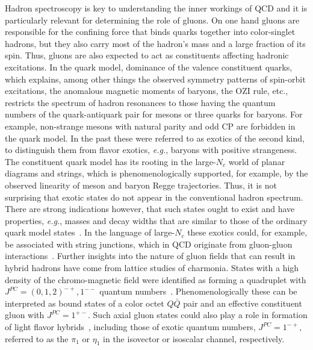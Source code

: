 Hadron spectroscopy is key to understanding the inner workings of QCD and it is particularly relevant for determining the role of gluons. On one hand gluons are responsible for the confining force that binds quarks together into color-singlet hadrons, but they also carry most of the hadron's mass and a large fraction of its spin. Thus, gluons are also expected to act as constituents affecting hadronic excitations. In the quark model, dominance of the valence constituent quarks, which explains, among other things the observed symmetry patterns of spin-orbit excitations, the anomalous magnetic moments of baryons, the OZI rule, etc., restricts the spectrum of hadron resonances to those having the quantum numbers of the quark-antiquark pair for mesons or three quarks for baryons. For example, non-strange mesons with natural parity and odd CP are forbidden in the quark model. In the past these were referred to as exotics of the second kind, to distinguish them from flavor exotics, \textit{e.g.}, baryons with positive strangeness. The  constituent  quark model has its rooting in the large-$N_c$ world of planar diagrams and strings, which is phenomenologically supported, for example, by the observed linearity of meson and baryon Regge trajectories. Thus, it is not surprising that exotic states do not appear in the conventional hadron spectrum. There are strong indications however, that such states ought to exist and have properties, \textit{e.g.}, masses and decay widths that are similar to those of the ordinary quark model  states~\cite{Cohen:1998jb}. In the language of large-$N_c$ these exotics could, for example, be associated with string junctions, which in QCD originate from gluon-gluon interactions~\cite{Montanet:1980te}. Further insights  into the nature of gluon fields that can result in hybrid hadrons have come from lattice studies of charmonia. States with a high density of the chromo-magnetic field were identified as forming a quadruplet with $J^{PC} = (0,1,2)^{-+},1^{--}$ quantum numbers~\cite{Liu:2012ze}. Phenomenologically  these can be interpreted as bound states of a color octet  $Q\bar Q$ pair and  an effective constituent gluon with $J^{PC} = 1^{+-}$. Such axial gluon states could also play a role in formation of light flavor 
hybrids~\cite{Szczepaniak:2001rg,Guo:2008yz}, 
  including those of exotic quantum numbers,  
  $J^{PC} = 1^{-+}$, referred to as the $\pi_1$ or $\eta_1$ in the isovector or isoscalar channel, respectively. 
